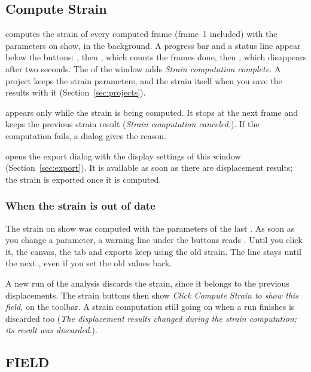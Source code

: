 \subsection{Compute Strain}

 computes the strain of every computed frame (frame~1 included) with the
parameters on show, in the background. A progress bar and a status line appear below the
buttons: , then , which counts the frames done, then
, which disappears after two seconds. The  of the window adds
\emph{Strain computation complete.} A project keeps the strain parameters, and the strain itself
when you save the results with it (Section~\ref{sec:projects}).

 appears only while the strain is being computed. It stops at the next frame and
keeps the previous strain result (\emph{Strain computation canceled.}). If the computation fails,
a  dialog gives the reason.

 opens the export dialog with the display settings of this window
(Section~\ref{sec:export}). It is available as soon as there are displacement results; the strain
is exported once it is computed.

\subsubsection*{When the strain is out of date}

The strain on show was computed with the parameters of the last . As soon as
you change a parameter, a warning line under the buttons reads . Until you click it, the canvas, the  tab and exports keep using
the old strain. The line stays until the next , even if you set the old values
back.

A new run of the analysis discards the strain, since it belongs to the previous displacements.
The strain buttons then show \emph{Click Compute Strain to show this field.} on the toolbar. A
strain computation still going on when a run finishes is discarded too (\emph{The displacement
results changed during the strain computation; its result was discarded.}).

\subsection{FIELD}
\label{sec:strain-fields}

